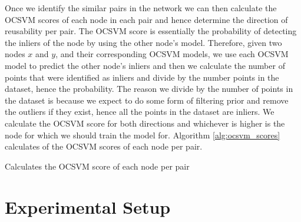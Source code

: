 \documentclass{mpaper}
\begin{document}
Once we identify the similar pairs in the network we can then calculate the OCSVM scores of each node in each pair and hence determine the direction of reusability per pair. The OCSVM score is essentially the probability of detecting the inliers of the node by using the other node's model.  Therefore, given two nodes $x$ and $y$, and their corresponding OCSVM models, we use each OCSVM model to predict the other node's inliers and then we calculate the number of points that were identified as inliers and divide by the number points in the dataset, hence the probability. The reason we divide by the number of points in the dataset is because we expect to do some form of filtering prior and remove the outliers if they exist, hence all the points in the dataset are inliers. We calculate the OCSVM score for both directions and whichever is higher is the node for which we should train the model for. Algorithm \ref{alg:ocsvm_scores} calculates of the OCSVM scores of each node per pair.

\begin{algorithm}
    \DontPrintSemicolon
    \caption{Calculates the OCSVM score of each node per pair
    }\label{alg:ocsvm_scores}
    
    
\end{algorithm}

\section{Experimental Setup}
\end{document}
